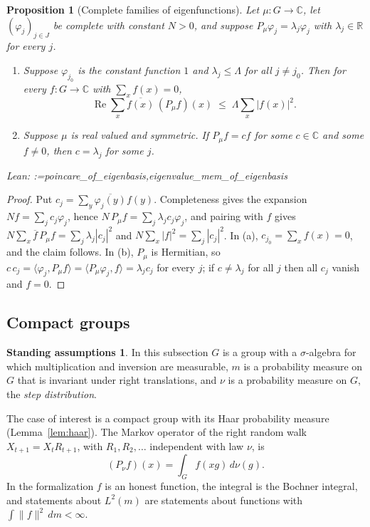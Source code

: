 \documentclass[11pt]{amsart}
\makeatletter
\newtheorem{proposition}[theorem]{Proposition}
\theoremstyle{definition}
\newtheorem{assumption}[theorem]{Standing assumptions}
\theoremstyle{remark}
\newcommand{\@leanlist}[1]{\def\@leansep{}\@for\@leanname:=#1\do{\@leansep
  \texttt{\expandafter\detokenize\expandafter{\@leanname}}\def\@leansep{, }}}
\newcommand{\lean}[1]{\par\smallskip\noindent
  {\footnotesize\normalfont\raggedright\textsf{Lean:} \@leanlist{#1}\par}}
\newcommand{\R}{\mathbb{R}}
\newcommand{\C}{\mathbb{C}}
\newcommand{\re}{\operatorname{Re}}
\newcommand{\ip}[2]{\langle #1,#2\rangle}
\makeatother
\begin{document}
\begin{proposition}[Complete families of eigenfunctions]\label{prop:eigenbasis}
Let $\mu\colon G\to\C$, let $(\varphi_j)_{j\in J}$ be complete with constant $N>0$, and suppose
$P_\mu\varphi_j=\lambda_j\varphi_j$ with $\lambda_j\in\R$ for every $j$.
\begin{enumerate}
\item[(a)] Suppose $\varphi_{j_0}$ is the constant function $1$ and $\lambda_j\le\Lambda$ for
all $j\ne j_0$.  Then for every $f\colon G\to\C$ with $\sum_xf(x)=0$,
\[
  \re\sum_x\overline{f(x)}\,(P_\mu f)(x)\;\le\;\Lambda\sum_x|f(x)|^2 .
\]
\item[(b)] Suppose $\mu$ is real valued and symmetric.  If $P_\mu f=cf$ for some $c\in\C$ and
some $f\ne0$, then $c=\lambda_j$ for some $j$.
\end{enumerate}
\lean{poincare_of_eigenbasis,eigenvalue_mem_of_eigenbasis}
\end{proposition}

\begin{proof}
Put $c_j=\sum_y\overline{\varphi_j(y)}f(y)$.  Completeness gives the expansion
$Nf=\sum_jc_j\varphi_j$, hence $N\,P_\mu f=\sum_j\lambda_jc_j\varphi_j$, and pairing with $f$
gives $N\sum_x\overline{f}\,P_\mu f=\sum_j\lambda_j|c_j|^2$ and $N\sum_x|f|^2=\sum_j|c_j|^2$.
In (a), $c_{j_0}=\sum_xf(x)=0$, and the claim follows.  In (b), $P_\mu$ is Hermitian, so
$c\,c_j=\ip{\varphi_j}{P_\mu f}=\ip{P_\mu\varphi_j}{f}=\lambda_jc_j$ for every $j$; if
$c\ne\lambda_j$ for all $j$ then all $c_j$ vanish and $f=0$.
\end{proof}

\subsection{Compact groups}\label{sec:compact}
\begin{assumption}\label{ass:compact}
In this subsection $G$ is a group with a $\sigma$-algebra for which multiplication and inversion
are measurable, $m$ is a probability measure on $G$ that is invariant under right translations,
and $\nu$ is a probability measure on $G$, the \emph{step distribution}.
\end{assumption}

The case of interest is a compact group with its Haar probability measure
(Lemma~\ref{lem:haar}).  The Markov operator of the right random walk
$X_{t+1}=X_tR_{t+1}$, with $R_1,R_2,\dots$ independent with law $\nu$, is
\[
  (P_\nu f)(x)=\int_Gf(xg)\,d\nu(g).
\]
In the formalization $f$ is an honest function, the integral is the Bochner integral, and
statements about $L^2(m)$ are statements about functions with $\int\lVert f\rVert^2\,dm<\infty$.
\end{document}
